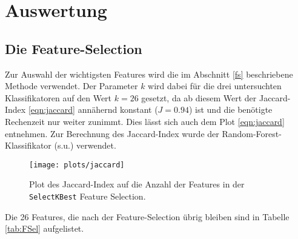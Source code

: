 \section{Auswertung}


\subsection{Die Feature-Selection}

Zur Auswahl der wichtigsten Features wird die im Abschnitt \ref{fs} beschriebene Methode verwendet. Der Parameter $k$ wird dabei für die drei untersuchten Klassifikatoren auf den Wert $k = 26$ gesetzt, da ab diesem Wert der Jaccard-Index \ref{eqn:jaccard} annähernd konstant ($J = 0.94$) ist und die benötigte Rechenzeit nur weiter zunimmt. Dies lässt sich auch dem Plot \ref{eqn:jaccard} entnehmen. Zur Berechnung des Jaccard-Index wurde der Random-Forest-Klassifikator (s.u.) verwendet. 

\begin{figure}
\centering
\texttt{[image: plots/jaccard]}
\caption{Plot des Jaccard-Index auf die Anzahl der Features in der \texttt{SelectKBest} Feature Selection.}
\label{fig:jaccard}
\end{figure}

Die 26 Features, die nach der Feature-Selection übrig bleiben sind in Tabelle \ref{tab:FSel} aufgelistet.



